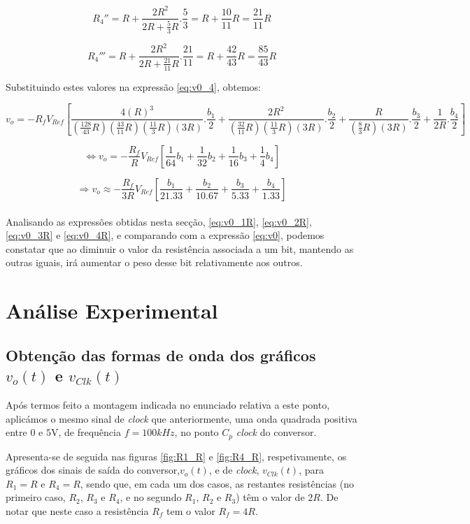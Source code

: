 \documentclass[a4paper,11pt]{report}
\begin{document}
$$R_4''=R+\frac{2R^2}{2R+\frac{5}{3}R}.\frac{5}{3}=R+\frac{10}{11}R=\frac{21}{11}R$$

$$R_4'''=R+\frac{2R^2}{2R+\frac{21}{11}R}.\frac{21}{11}=R+\frac{42}{43}R=\frac{85}{43}R$$

Substituindo estes valores na expressão \ref{eq:v0_4}, obtemos:

$$v_o=-R_fV_{Ref}\left[\frac{4\left(R\right)^3}{\left(\frac{128}{43}R\right)\left(\frac{43}{11}R\right)\left(\frac{11}{3}R\right)\left(3R\right)}.\frac{b_1}{2}+\frac{2R^2}{\left(\frac{32}{11}R\right)\left(\frac{11}{3}R\right)\left(3R\right)}.\frac{b_2}{2}+\frac{R}{\left(\frac{8}{3}R\right)\left(3R\right)}.\frac{b_3}{2}+\frac{1}{2R}.\frac{b_4}{2}\right]$$

$$\Leftrightarrow v_o=-\frac{R_f}{R}V_{Ref}\left[\frac{1}{64}b_1+\frac{1}{32}b_2+\frac{1}{16}b_3+\frac{1}{4}b_4\right]$$

\begin{equation}\label{eq:v0_4R}
\Rightarrow v_o \approx -\frac{R_f}{3R}V_{Ref}\left[\frac{b_1}{21.33}+\frac{b_2}{10.67}+\frac{b_3}{5.33}+\frac{b_4}{1.33}\right]
\end{equation}\\

Analisando as expressões obtidas nesta secção, \ref{eq:v0_1R}, \ref{eq:v0_2R}, \ref{eq:v0_3R} e \ref{eq:v0_4R}, e comparando com a expressão \ref{eq:v0}, podemos constatar que ao diminuir o valor da resistência associada a um bit, mantendo as outras iguais, irá aumentar o peso desse bit relativamente aos outros. 

\section{Análise Experimental}

\subsection{Obtenção das formas de onda dos gráficos $v_o(t)$ e $v_{Clk}(t)$}

Após termos feito a montagem indicada no enunciado relativa a este ponto, aplicámos o mesmo sinal de \textit{clock} que anteriormente, uma onda quadrada positiva entre $0$ e $5$V, de frequência $f=100kHz$, no ponto $C_p$ \textit{clock} do conversor.

Apresenta-se de seguida nas figuras \ref{fig:R1_R} e \ref{fig:R4_R}, respetivamente, os gráficos dos sinais de saída do conversor,$v_o(t)$, e de \textit{clock}, $v_{Clk}(t)$, para $R_1=R$ e $R_4=R$, sendo que, em cada um dos casos, as restantes resistências (no primeiro caso, $R_2$, $R_3$ e $R_4$, e no segundo $R_1$, $R_2$ e $R_3$) têm o valor de $2R$. De notar que neste caso a resistência $R_f$ tem o valor $R_f=4R$.\\
\end{document}
